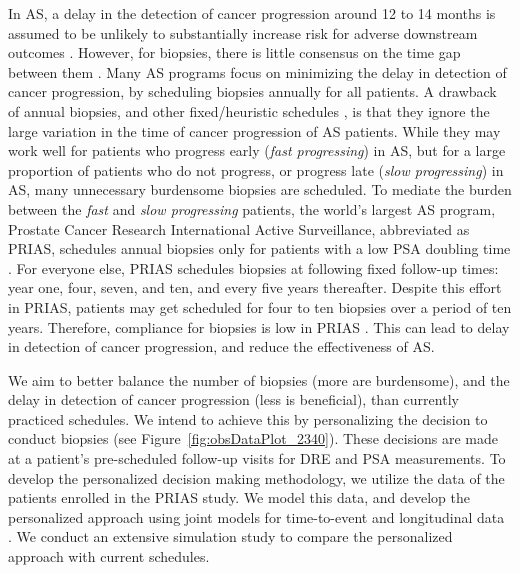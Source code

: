 In AS, a delay in the detection of cancer progression around 12 to 14 months is assumed to be unlikely to substantially increase risk for adverse downstream outcomes \cite{inoue2018comparative,carvalho}. However, for biopsies, there is little consensus on the time gap between them \cite{loeb2014heterogeneity,bruinsma2016active}. Many AS programs focus on minimizing the delay in detection of cancer progression, by scheduling biopsies annually for all patients. A drawback of annual biopsies, and other fixed/heuristic schedules \cite{inoue2018comparative,nieboer2018active}, is that they ignore the large variation in the time of cancer progression of AS patients. While they may work well for patients who progress early (\textit{fast progressing}) in AS, but for a large proportion of patients who do not progress, or progress late (\textit{slow progressing}) in AS, many unnecessary burdensome biopsies are scheduled. To mediate the burden between the \textit{fast} and \textit{slow progressing} patients, the world's largest AS program, Prostate Cancer Research International Active Surveillance\cite{bokhorst2016decade}, abbreviated as PRIAS, schedules annual biopsies only for patients with a low PSA doubling time \cite{bokhorst2015compliance}. For everyone else, PRIAS schedules biopsies at following fixed follow-up times: year one, four, seven, and ten, and every five years thereafter. Despite this effort in PRIAS, patients may get scheduled for four to ten biopsies over a period of ten years. Therefore, compliance for biopsies is low in PRIAS \cite{bokhorst2015compliance}. This can lead to delay in detection of cancer progression, and reduce the effectiveness of AS.


We aim to better balance the number of biopsies (more are burdensome), and the delay in detection of cancer progression (less is beneficial), than currently practiced schedules. We intend to achieve this by personalizing the decision to conduct biopsies (see Figure~\ref{fig:obsDataPlot_2340}). These decisions are made at a patient's pre-scheduled follow-up visits for DRE and PSA measurements. To develop the personalized decision making methodology, we utilize the data of the patients enrolled in the PRIAS study. We model this data, and develop the personalized approach using joint models for time-to-event and longitudinal data \cite{tsiatis2004joint,rizopoulos2012joint}. We conduct an extensive simulation study to compare the personalized approach with current schedules.

